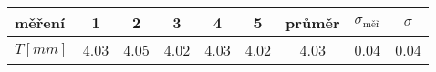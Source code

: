 \begin{tabular}{
    l
    S[table-format=1.2]
    S[table-format=1.2]
    S[table-format=1.2]
    S[table-format=1.2]
    S[table-format=1.2]
    S[table-format=1.2]
    S[table-format=1.2]
    S[table-format=1.2]
} \toprule
měření       & {1}  & {2}  & {3}  & {4}  & {5}  & {průměr} & {$\sigma_\text{měř}$} & {$\sigma$} \\ \midrule
$T[\si{mm}]$ & 4.03 & 4.05 & 4.02 & 4.03 & 4.02 & 4.03     & 0.04                  & 0.04        \\ \bottomrule

\end{tabular}